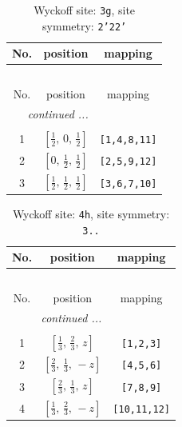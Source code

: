 \documentclass[fleqn,8pt]{jsarticle}
\begin{document}
\begin{longtable}{ccc}
\caption{Wyckoff site: {\tt 3g}, site symmetry: {\tt 2'22'}}
 \\
 \hline \hline
No. & position & mapping \\ \hline \endfirsthead

\multicolumn{2}{l}{\tablename\ \thetable{}} \\
 \hline \hline
No. & position & mapping \\ \hline \endhead

 \hline \hline
\multicolumn{2}{r}{\footnotesize\it continued ...} \\ \endfoot

 \hline \hline
\multicolumn{2}{r}{} \\ \endlastfoot

1 & $\left[ \frac{1}{2},\, 0,\, \frac{1}{2} \right]$ & {\tt [1,4,8,11]} \\ \hline
2 & $\left[ 0,\, \frac{1}{2},\, \frac{1}{2} \right]$ & {\tt [2,5,9,12]} \\ \hline
3 & $\left[ \frac{1}{2},\, \frac{1}{2},\, \frac{1}{2} \right]$ & {\tt [3,6,7,10]} \\
\end{longtable}
\renewcommand{\arraystretch}{1.2}
\begin{longtable}{ccc}
\caption{Wyckoff site: {\tt 4h}, site symmetry: {\tt 3..}}
 \\
 \hline \hline
No. & position & mapping \\ \hline \endfirsthead

\multicolumn{2}{l}{\tablename\ \thetable{}} \\
 \hline \hline
No. & position & mapping \\ \hline \endhead

 \hline \hline
\multicolumn{2}{r}{\footnotesize\it continued ...} \\ \endfoot

 \hline \hline
\multicolumn{2}{r}{} \\ \endlastfoot

1 & $\left[ \frac{1}{3},\, \frac{2}{3},\, z \right]$ & {\tt [1,2,3]} \\ \hline
2 & $\left[ \frac{2}{3},\, \frac{1}{3},\, - z \right]$ & {\tt [4,5,6]} \\ \hline
3 & $\left[ \frac{2}{3},\, \frac{1}{3},\, z \right]$ & {\tt [7,8,9]} \\ \hline
4 & $\left[ \frac{1}{3},\, \frac{2}{3},\, - z \right]$ & {\tt [10,11,12]} \\
\end{longtable}
\end{document}
